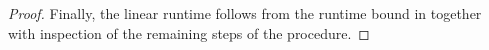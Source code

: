 \documentclass[11pt]{article}
\newcommand{\gap}{\mathrm{gap}}
\theoremstyle{plain}
\newcommand{\eps}{\varepsilon}
\newcommand{\IslamNote}[1]{\textcolor{orange}{(Islam: #1)}}
\newcommand{\IslamNote}[1]{}
\begin{document}
\begin{proof}
   

    
    
    Finally, the linear runtime follows from the runtime bound in  together with inspection of the remaining steps of the procedure.


\end{proof}
\end{document}
